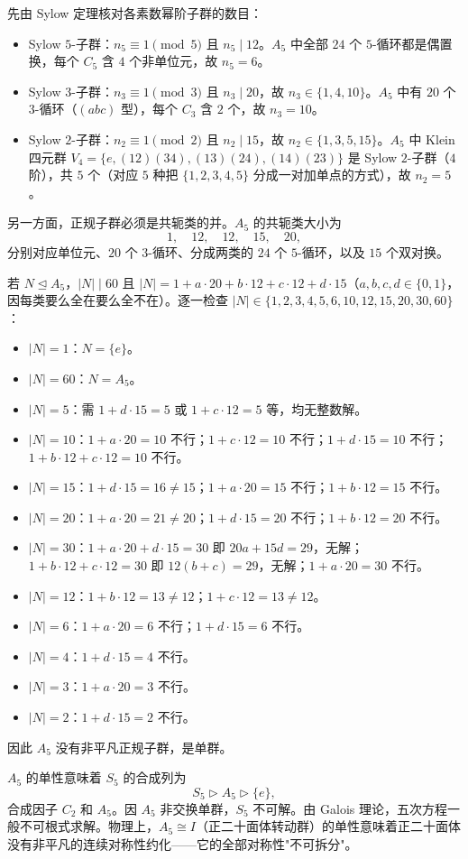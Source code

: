 先由 Sylow 定理核对各素数幂阶子群的数目：
\begin{itemize}
\item Sylow $5$-子群：$n_5\equiv1\pmod5$ 且 $n_5\mid12$。$A_5$ 中全部 $24$ 个 $5$-循环都是偶置换，每个 $C_5$ 含 $4$ 个非单位元，故 $n_5=6$。
\item Sylow $3$-子群：$n_3\equiv1\pmod3$ 且 $n_3\mid20$，故 $n_3\in\{1,4,10\}$。$A_5$ 中有 $20$ 个 $3$-循环（$(abc)$ 型），每个 $C_3$ 含 $2$ 个，故 $n_3=10$。
\item Sylow $2$-子群：$n_2\equiv1\pmod2$ 且 $n_2\mid15$，故 $n_2\in\{1,3,5,15\}$。$A_5$ 中 Klein 四元群 $V_4=\{e,(12)(34),(13)(24),(14)(23)\}$ 是 Sylow $2$-子群（$4$ 阶），共 $5$ 个（对应 $5$ 种把 $\{1,2,3,4,5\}$ 分成一对加单点的方式），故 $n_2=5$。
\end{itemize}

另一方面，正规子群必须是共轭类的并。$A_5$ 的共轭类大小为
\[
1,\quad 12,\quad 12,\quad 15,\quad 20,
\]
分别对应单位元、$20$ 个 $3$-循环、分成两类的 $24$ 个 $5$-循环，以及 $15$ 个双对换。

若 $N\mathrel{\trianglelefteq} A_5$，$|N|\mid60$ 且 $|N|=1+a\cdot20+b\cdot12+c\cdot12+d\cdot15$（$a,b,c,d\in\{0,1\}$，因每类要么全在要么全不在）。逐一检查 $|N|\in\{1,2,3,4,5,6,10,12,15,20,30,60\}$：
\begin{itemize}
\item $|N|=1$：$N=\{e\}$。
\item $|N|=60$：$N=A_5$。
\item $|N|=5$：需 $1+d\cdot15=5$ 或 $1+c\cdot12=5$ 等，均无整数解。
\item $|N|=10$：$1+a\cdot20=10$ 不行；$1+c\cdot12=10$ 不行；$1+d\cdot15=10$ 不行；$1+b\cdot12+c\cdot12=10$ 不行。
\item $|N|=15$：$1+d\cdot15=16\neq15$；$1+a\cdot20=15$ 不行；$1+b\cdot12=15$ 不行。
\item $|N|=20$：$1+a\cdot20=21\neq20$；$1+d\cdot15=20$ 不行；$1+b\cdot12=20$ 不行。
\item $|N|=30$：$1+a\cdot20+d\cdot15=30$ 即 $20a+15d=29$，无解；$1+b\cdot12+c\cdot12=30$ 即 $12(b+c)=29$，无解；$1+a\cdot20=30$ 不行。
\item $|N|=12$：$1+b\cdot12=13\neq12$；$1+c\cdot12=13\neq12$。
\item $|N|=6$：$1+a\cdot20=6$ 不行；$1+d\cdot15=6$ 不行。
\item $|N|=4$：$1+d\cdot15=4$ 不行。
\item $|N|=3$：$1+a\cdot20=3$ 不行。
\item $|N|=2$：$1+d\cdot15=2$ 不行。
\end{itemize}
因此 $A_5$ 没有非平凡正规子群，是单群。

$A_5$ 的单性意味着 $S_5$ 的合成列为
\[
S_5\rhd A_5\rhd\{e\},
\]
合成因子 $C_2$ 和 $A_5$。因 $A_5$ 非交换单群，$S_5$ 不可解。由 Galois 理论，五次方程一般不可根式求解。物理上，$A_5\cong I$（正二十面体转动群）的单性意味着正二十面体没有非平凡的连续对称性约化——它的全部对称性"不可拆分"。

